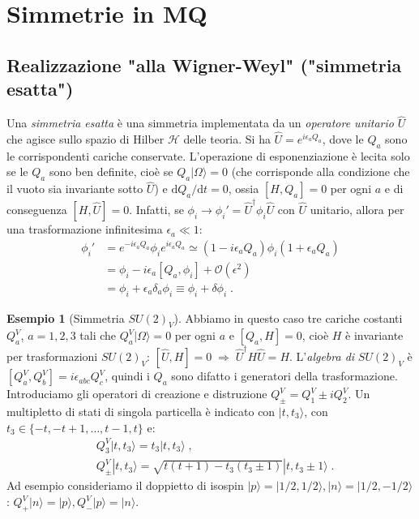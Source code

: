 \documentclass[12pt,a4paper]{article}
\theoremstyle{definition}
\newtheorem{exm}{Esempio}
\newcommand{\diff}[1][]{\mathrm{d}#1}
\newcommand{\ket}{\rangle}
\newcommand{\adj}[1]{#1^{\dagger}}
\numberwithin{equation}{section}
\begin{document}
\section{Simmetrie in MQ}
\subsection{Realizzazione "alla Wigner-Weyl" ("simmetria esatta")}
Una \emph{simmetria esatta} è una simmetria implementata da un \emph{operatore unitario} $\hat{U}$ che agisce sullo spazio di Hilber $\mathcal{H}$ delle teoria. Si ha $\hat{U}=e^{i\epsilon_a Q_a}$, dove le $Q_a$ sono le corrispondenti cariche conservate. L'operazione di esponenziazione è lecita solo se le $Q_a$ sono ben definite, cioè se $Q_a|\Omega\ket=0$ (che corrisponde alla condizione che il vuoto sia invariante sotto $\hat{U}$) e $\diff{Q_a}/\diff{t}=0$, ossia $[H,Q_a]=0$ per ogni $a$ e di conseguenza $[H,\hat{U}]=0$. Infatti, se $\phi_i\to \phi_i'=\adj{\hat{U}}\phi_i\hat{U}$ con $\hat{U}$ unitario, allora per una trasformazione infinitesima $\epsilon_a\ll 1$:
\begin{align*}
\phi_i' &= e^{-i\epsilon_a Q_a}\phi_i e^{i\epsilon_a Q_a}\simeq (1-i\epsilon_aQ_a)\phi_i(1+\epsilon_a Q_a) \\
&= \phi_i-i\epsilon_a[Q_a,\phi_i]+\mathcal{O}(\epsilon^2) \\
&=\phi_i+\epsilon_a\delta_a\phi_i\equiv\phi_i+\delta\phi_i\;.
\end{align*}
\begin{exm}[Simmetria $SU(2)_V$] 
Abbiamo in questo caso tre cariche costanti $Q_a^V$, $a=1,2,3$ tali che $Q_a^V|\Omega\ket=0$ per ogni $a$ e $[Q_a,H]=0$, cioè $H$ è invariante per trasformazioni $SU(2)_V$: $[\hat{U},H]=0\;\Rightarrow\; \adj{\hat{U}}H\hat{U}=H$. L'\emph{algebra di} $SU(2)_V$ è $[Q_a^V,Q_b^V]=i\epsilon_{abc}Q_c^V$, quindi i $Q_a$ sono difatto i generatori della trasformazione. Introduciamo gli operatori di creazione e distruzione $Q^V_{\pm}=Q_1^V\pm iQ_2^V$. Un multipletto di stati di singola particella è indicato con $|t,t_3\ket$, con $t_3\in \{-t,-t+1,\ldots,t-1,t\}$ e:
\begin{align*}
&Q_3^V|t,t_3\ket=t_3|t,t_3\ket \;,\\
&Q_{\pm}^V|t,t_3\ket=\sqrt{t(t+1)-t_3(t_3\pm 1)}|t,t_3\pm 1\ket\;.
\end{align*}
Ad esempio consideriamo il doppietto di isospin $|p\ket=|1/2,1/2\ket,|n\ket=|1/2,-1/2\ket$: $Q_+^V|n\ket=|p\ket,Q_-^V|p\ket=|n\ket$.

\end{exm}
\end{document}
